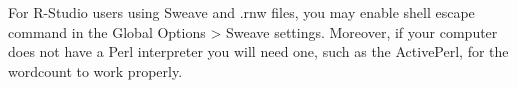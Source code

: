 \documentclass{trb_unofficial}
\begin{document}
For R-Studio users using Sweave and .rnw files, you may enable shell escape command in the Global Options > Sweave settings.  Moreover, if your computer does not have a Perl interpreter you will need one, such as the ActivePerl, for the wordcount to work properly.

\newpage




\nolinenumbers
\end{document}
